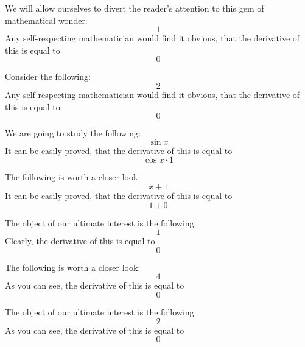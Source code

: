 \documentclass{article}
\begin{document}
We will allow ourselves to divert the reader's attention to this gem of mathematical wonder:
\begin{equation}
1 
\end{equation}
Any self-respecting mathematician would find it obvious, that the derivative of this is equal to
\begin{equation}
0 
\end{equation}

Consider the following:
\begin{equation}
2 
\end{equation}
Any self-respecting mathematician would find it obvious, that the derivative of this is equal to
\begin{equation}
0 
\end{equation}

We are going to study the following:
\begin{equation}
\sin x 
\end{equation}
It can be easily proved, that the derivative of this is equal to
\begin{equation}
\cos x \cdot 1 
\end{equation}

The following is worth a closer look:
\begin{equation}
x + 1 
\end{equation}
It can be easily proved, that the derivative of this is equal to
\begin{equation}
1 + 0 
\end{equation}

The object of our ultimate interest is the following:
\begin{equation}
1 
\end{equation}
Clearly, the derivative of this is equal to
\begin{equation}
0 
\end{equation}

The following is worth a closer look:
\begin{equation}
4 
\end{equation}
As you can see, the derivative of this is equal to
\begin{equation}
0 
\end{equation}

The object of our ultimate interest is the following:
\begin{equation}
2 
\end{equation}
As you can see, the derivative of this is equal to
\begin{equation}
0 
\end{equation}
\end{document}
